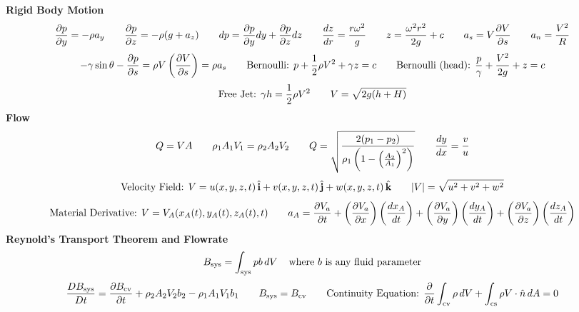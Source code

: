 \documentclass{article}
\begin{document}
\begin{center}
    {\large{\bf Rigid Body Motion\\}}
    \vspace{3 mm}
    \[\frac{\partial p}{\partial y}=-\rho a_y\hspace{7 mm}\frac{\partial p}{\partial z}=-\rho(g+a_z)\hspace{7 mm}dp=\frac{\partial p}{\partial y}dy+\frac{\partial p}{\partial z}dz\hspace{7 mm}\frac{dz}{dr}=\frac{r\omega^2}{g}\hspace{7 mm}z=\frac{\omega^2r^2}{2g}+c\hspace{7 mm}a_s=V\frac{\partial V}{\partial s}\hspace{7 mm}a_n=\frac{V^2}{R}\]
    \[-\gamma\sin\theta-\frac{\partial p}{\partial s}=\rho V\left(\frac{\partial V}{\partial s}\right)=\rho a_s\hspace{7mm}\textnormal{Bernoulli: }p+\frac{1}{2}\rho V^2+\gamma z = c\hspace{7mm}\textnormal{Bernoulli (head): } \frac{p}{\gamma}+\frac{V^2}{2g}+z=c\]
    \[\textnormal{Free Jet: }\gamma h = \frac{1}{2}\rho V^2\hspace{7mm}V=\sqrt{2g(h+H)}\]
    {\large{\bf Flow\\}}
    \vspace{3 mm}
    \[Q=VA\hspace{7mm}\rho_1A_1V_1=\rho_2A_2V_2\hspace{7mm}Q=\sqrt{\frac{2(p_1-p_2)}{\rho_1\left(1-\left(\frac{A_2}{A_1}\right)^2\right)}}\hspace{7mm}\frac{dy}{dx}=\frac{v}{u}\]
    \[\textnormal{Velocity Field: }V=u(x,y,z,t)\,\hat{\textbf{i}}+v(x,y,z,t)\,\hat{\textbf{j}}+w(x,y,z,t)\,\hat{\textbf{k}}\hspace{7 mm}|V|=\sqrt{u^2+v^2+w^2}\]
    \[\textnormal{Material Derivative: }V=V_A(x_A(t),y_A(t),z_A(t),t)\hspace{7 mm}a_A=\frac{\partial V_a}{\partial t}+\left(\frac{\partial V_a}{\partial x}\right)\left(\frac{dx_A}{dt}\right)+\left(\frac{\partial V_a}{\partial y}\right)\left(\frac{dy_A}{dt}\right)+\left(\frac{\partial V_a}{\partial z}\right)\left(\frac{dz_A}{dt}\right)\]
    {\large{\bf Reynold's Transport Theorem and Flowrate\\}}
    \vspace{3 mm}
    \[B_{\textnormal{sys}}=\int_{\textnormal{sys}}pb\,dV\hspace{4 mm}\textnormal{where }b\textnormal{ is any fluid parameter}\]
    \[\frac{DB_{\textnormal{sys}}}{Dt}=\frac{\partial B_{\textnormal{cv}}}{\partial t}+\rho_2A_2V_2b_2-\rho_1A_1V_1b_1\hspace{7mm}B_\textnormal{sys}=B_\textnormal{cv}\hspace{7mm}\textnormal{Continuity Equation: }\frac{\partial}{\partial t}\int_{\textnormal{cv}}\rho\,dV+\int_{\textnormal{cs}}\rho V\cdot\hat{n}\,dA=0\]

\end{center}
\end{document}
